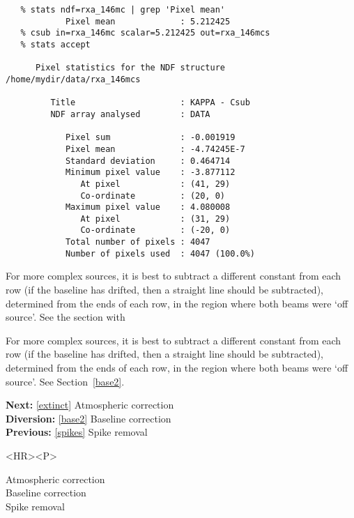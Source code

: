 \begin{verbatim}
   % stats ndf=rxa_146mc | grep 'Pixel mean'
            Pixel mean             : 5.212425
   % csub in=rxa_146mc scalar=5.212425 out=rxa_146mcs
   % stats accept

      Pixel statistics for the NDF structure /home/mydir/data/rxa_146mcs

         Title                     : KAPPA - Csub
         NDF array analysed        : DATA

            Pixel sum              : -0.001919
            Pixel mean             : -4.74245E-7
            Standard deviation     : 0.464714
            Minimum pixel value    : -3.877112
               At pixel            : (41, 29)
               Co-ordinate         : (20, 0)
            Maximum pixel value    : 4.080008
               At pixel            : (31, 29)
               Co-ordinate         : (-20, 0)
            Total number of pixels : 4047
            Number of pixels used  : 4047 (100.0%)
\end{verbatim}

\begin{htmlonly}
   For more complex sources, it is best
   to subtract a different constant from each row (if the baseline has
   drifted, then a straight line should be subtracted), determined from
   the ends of each row, in the region where both beams were `off source'.
   See the section with
\end{htmlonly}
\begin{latexonly}
   For more complex sources, it is best
   to subtract a different constant from each row (if the baseline has
   drifted, then a straight line should be subtracted), determined from
   the ends of each row, in the region where both beams were `off source'.
   See
Section~\ref{base2}.
\end{latexonly}

\begin{latexonly}
{\bf Next:} \ref{extinct} Atmospheric correction\\
{\bf Diversion:} \ref{base2} Baseline correction\\
{\bf Previous:} \ref{spikes} Spike removal\\
\end{latexonly}

\begin{htmlonly}
\begin{rawhtml} <HR><P> \end{rawhtml}
{\bf {}} Atmospheric correction\\
{\bf {}} Baseline correction\\
{\bf {}} Spike removal\\
{\bf {}}\\
{\bf {}}\\
\end{htmlonly}


